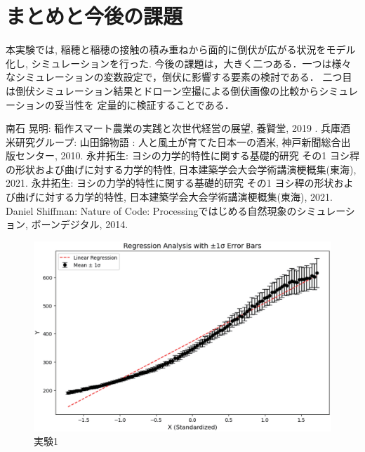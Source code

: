 \documentclass[twocolumn]{jarticle}
\begin{document}
\section{まとめと今後の課題}
本実験では, 稲穂と稲穂の接触の積み重ねから面的に倒伏が広がる状況をモデル化し, シミュレーションを行った. 
今後の課題は，大きく二つある．一つは様々なシミュレーションの変数設定で，倒伏に影響する要素の検討である．
二つ目は倒伏シミュレーション結果とドローン空撮による倒伏画像の比較からシミュレーションの妥当性を
定量的に検証することである．


\begin{thebibliography}{99}
南石 晃明: 稲作スマート農業の実践と次世代経営の展望, 養賢堂, 2019
.
兵庫酒米研究グループ: 山田錦物語 : 人と風土が育てた日本一の酒米, 神戸新聞総合出版センター, 2010.
永井拓生: ヨシの力学的特性に関する基礎的研究 その1 ヨシ稈の形状および曲げに対する力学的特性, 日本建築学会大会学術講演梗概集(東海), 2021.
永井拓生: ヨシの力学的特性に関する基礎的研究 その1 ヨシ稈の形状および曲げに対する力学的特性, 日本建築学会大会学術講演梗概集(東海), 2021.
Daniel Shiffman: Nature of Code: Processingではじめる自然現象のシミュレーション, ボーンデジタル, 2014.
\end{thebibliography}

\begin{figure}[b]
    \centering
    \includegraphics[width=\linewidth]{fig/e1.eps}
    \caption{実験1}
    \label{fig:e1}
\end{figure}
\end{document}
